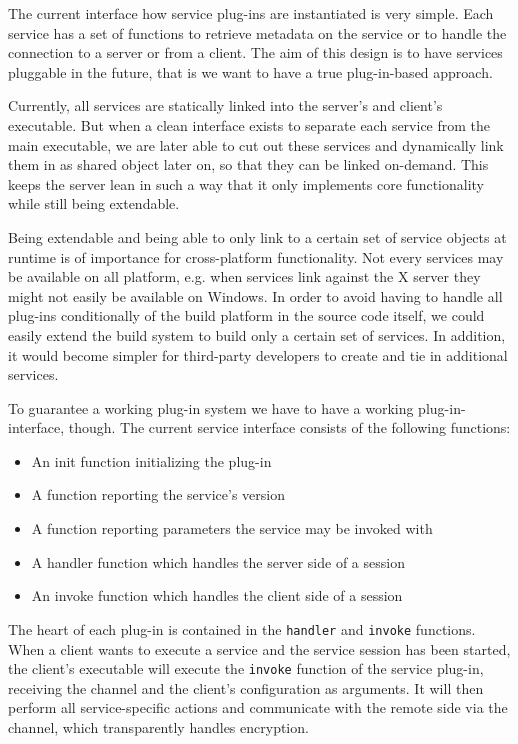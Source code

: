 The current interface how service plug-ins are instantiated is very simple.
Each service has a set of functions to retrieve metadata on the service or to handle the connection to a server or from a client.
The aim of this design is to have services pluggable in the future, that is we want to have a true plug-in-based approach.

Currently, all services are statically linked into the server's and client's executable.
But when a clean interface exists to separate each service from the main executable, we are later able to cut out these services and dynamically link them in as shared object later on, so that they can be linked on-demand.
This keeps the server lean in such a way that it only implements core functionality while still being extendable.

Being extendable and being able to only link to a certain set of service objects at runtime is of importance for cross-platform functionality.
Not every services may be available on all platform, e.g. when services link against the X server they might not easily be available on Windows.
In order to avoid having to handle all plug-ins conditionally of the build platform in the source code itself, we could easily extend the build system to build only a certain set of services.
In addition, it would become simpler for third-party developers to create and tie in additional services.

\medskip

To guarantee a working plug-in system we have to have a working plug-in-interface, though.
The current service interface consists of the following functions:
\begin{itemize}
    \item An init function initializing the plug-in
    \item A function reporting the service's version
    \item A function reporting parameters the service may be invoked with
    \item A handler function which handles the server side of a session
    \item An invoke function which handles the client side of a session
\end{itemize}

The heart of each plug-in is contained in the \lstinline{handler} and \lstinline{invoke} functions.
When a client wants to execute a service and the service session has been started, the client's executable will execute the \lstinline{invoke} function of the service plug-in, receiving the channel and the client's configuration as arguments.
It will then perform all service-specific actions and communicate with the remote side via the channel, which transparently handles encryption.

